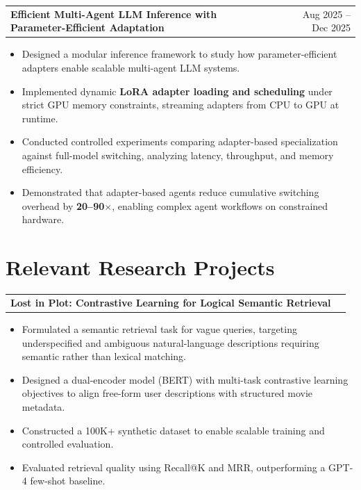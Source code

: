 \documentclass[a4paper,11pt]{article}
\begin{document}
\begin{tabularx}{\linewidth}{@{}X r@{}}
\textbf{Efficient Multi-Agent LLM Inference with Parameter-Efficient Adaptation} & Aug 2025 – Dec 2025 \\
\end{tabularx}
\begin{itemize}[nosep, after=\strut, leftmargin=1.5em, itemsep=2pt]
    \item Designed a modular inference framework to study how parameter-efficient adapters enable scalable multi-agent LLM systems.
    \item Implemented dynamic \textbf{LoRA adapter loading and scheduling} under strict GPU memory constraints, streaming adapters from CPU to GPU at runtime.
    \item Conducted controlled experiments comparing adapter-based specialization against full-model switching, analyzing latency, throughput, and memory efficiency.
    \item Demonstrated that adapter-based agents reduce cumulative switching overhead by \textbf{20–90$\times$}, enabling complex agent workflows on constrained hardware.
\end{itemize}

\color{BlueViolet}
\section{Relevant Research Projects}
\color{black}
\begin{tabularx}{\linewidth}{@{}X r@{}}
\textbf{Lost in Plot: Contrastive Learning for Logical Semantic Retrieval} & \\
\end{tabularx}
\begin{itemize}[nosep, after=\strut, leftmargin=1.5em, itemsep=2pt]
    \item Formulated a semantic retrieval task for vague queries, targeting underspecified and ambiguous natural-language descriptions requiring semantic rather than lexical matching.
    \item Designed a dual-encoder model (BERT) with multi-task contrastive learning objectives to align free-form user descriptions with structured movie metadata.
    \item Constructed a 100K+ synthetic dataset to enable scalable training and controlled evaluation.
    \item Evaluated retrieval quality using Recall@K and MRR, outperforming a GPT-4 few-shot baseline.
\end{itemize}
\end{document}
